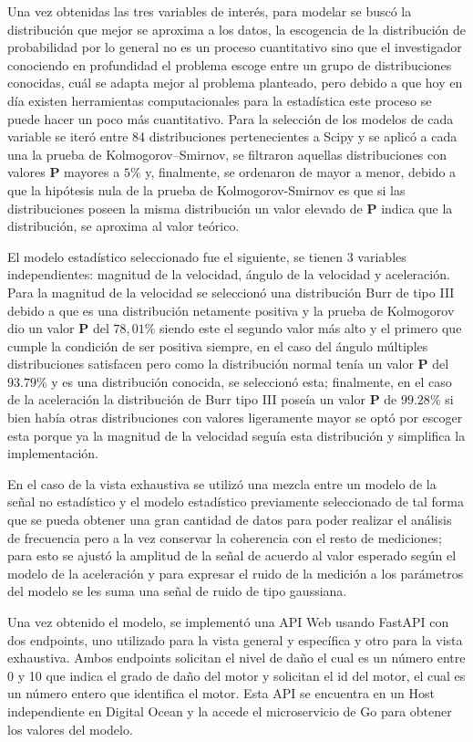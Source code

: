 Una vez obtenidas las tres variables de interés, para modelar se buscó la
distribución que mejor se aproxima a los datos, la escogencia de la
distribución de probabilidad por lo general no es un proceso cuantitativo sino
que el investigador conociendo en profundidad el problema escoge entre un grupo
de distribuciones conocidas, cuál se adapta mejor al problema planteado, pero
debido a que hoy en día existen herramientas computacionales para la
estadística este proceso se puede hacer un poco más cuantitativo. Para la
selección de los modelos de cada variable se iteró entre 84 distribuciones
pertenecientes a Scipy y se aplicó a cada una la prueba de Kolmogorov–Smirnov,
se filtraron aquellas distribuciones con valores \textbf{P} mayores a $5\%$ y, finalmente, se
ordenaron de mayor a menor, debido a que la hipótesis nula de la
prueba de Kolmogorov-Smirnov es que si las distribuciones poseen la misma
distribución un valor elevado de \textbf{P} indica que la distribución, se aproxima al
valor teórico.

El modelo estadístico seleccionado fue el siguiente, se tienen 3
variables independientes: magnitud de la velocidad, ángulo de la velocidad y
aceleración. Para la magnitud de la velocidad se seleccionó una distribución
Burr de tipo III debido a que es una distribución netamente positiva y la
prueba de Kolmogorov dio un valor \textbf{P} del $78,01\%$ siendo este el segundo valor más
alto y el primero que cumple la condición de ser positiva siempre, en el caso
del ángulo múltiples distribuciones satisfacen pero como la distribución normal
tenía un valor \textbf{P} del $93.79\%$ y es una distribución conocida, se seleccionó esta;
finalmente, en el caso de la aceleración la distribución de Burr tipo III poseía
un valor \textbf{P} de $99.28\%$ si bien había otras distribuciones con valores ligeramente
mayor se optó por escoger esta porque ya la magnitud de la velocidad seguía esta
distribución y simplifica la implementación.

En el caso de la vista exhaustiva se utilizó una mezcla entre un modelo de la
señal no estadístico y el modelo estadístico previamente seleccionado de tal
forma que se pueda obtener una gran cantidad de datos para poder realizar el
análisis de frecuencia pero a la vez conservar la coherencia con el resto de
mediciones; para esto se ajustó la amplitud de la señal de acuerdo al valor
esperado según el modelo de la aceleración y para expresar el ruido de la
medición a los parámetros del modelo se les suma una señal de ruido de tipo
gaussiana.

Una vez obtenido el modelo, se implementó una API Web usando FastAPI con dos
endpoints, uno utilizado para la vista general y específica y otro para la
vista exhaustiva. Ambos endpoints solicitan el nivel de daño el cual es un
número entre 0 y 10 que indica el grado de daño del motor y solicitan el id del
motor, el cual es un número entero  que identifica el motor. Esta API se encuentra
en un Host independiente en Digital Ocean y la accede el microservicio de Go
para obtener los valores del modelo.
